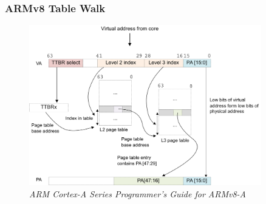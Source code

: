 \documentclass[xcolor=pdftex,dvipsnames,table]{beamer}
\begin{document}
\begin{frame}
\frametitle{ARMv8 Table Walk}
\begin{figure}[htbp]
	\centering
	\includegraphics[width=0.9\textwidth]{generating_address_of_level2_page_table_entry}
	\caption {\textit{ARM Cortex-A Series Programmer’s Guide for ARMv8-A}}
\end{figure}
\end{frame}



\end{document}
